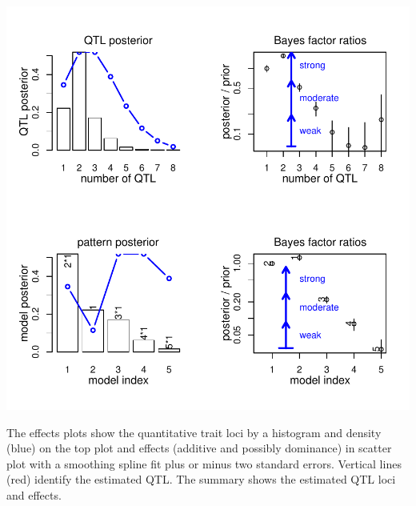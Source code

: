 \documentclass{article}
\begin{document}
\includegraphics{bim_summary-007}

The effects plots show the quantitative trait loci by a histogram and
density (blue) on the top plot and effects (additive and possibly
dominance) in scatter plot with a smoothing spline fit plus or minus
two standard errors. Vertical lines (red) identify the estimated QTL.
The summary shows the estimated QTL loci and effects.
\end{document}
